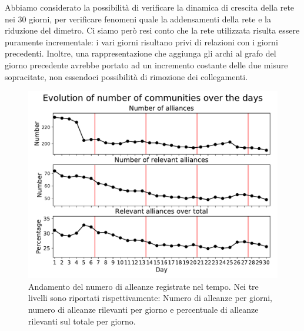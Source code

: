 Abbiamo considerato la possibilità di verificare la dinamica di crescita della rete nei 30 giorni, per verificare fenomeni quale la addensamenti della rete e la riduzione del dimetro.
Ci siamo però resi conto che la rete utilizzata risulta essere puramente incrementale: i vari giorni risultano privi di relazioni con i giorni precedenti. Inoltre, una rappresentazione che aggiunga gli archi al grafo del giorno precedente avrebbe portato ad un incremento costante delle due misure sopracitate, non essendoci possibilità di rimozione dei collegamenti.
\begin{figure}
	\centering
	\includegraphics[width=0.85\linewidth]{images/alliances_each_day}
	\caption{Andamento del numero di alleanze registrate nel tempo. Nei tre livelli sono riportati rispettivamente: Numero di alleanze per giorni, numero di alleanze rilevanti per giorno e percentuale di alleanze rilevanti sul totale per giorno.}
	\label{fig:allianceseachday}
\end{figure}

\newpage
